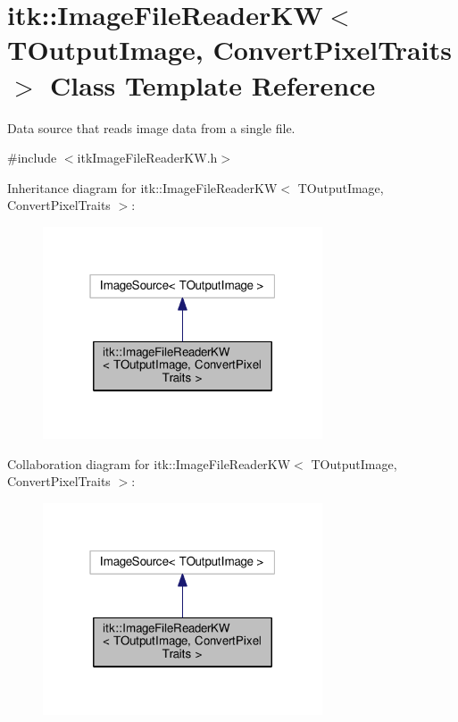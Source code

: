\hypertarget{classitk_1_1_image_file_reader_k_w}{}\section{itk\+:\+:Image\+File\+Reader\+KW$<$ T\+Output\+Image, Convert\+Pixel\+Traits $>$ Class Template Reference}
\label{classitk_1_1_image_file_reader_k_w}


Data source that reads image data from a single file.  




{\ttfamily \#include $<$itk\+Image\+File\+Reader\+K\+W.\+h$>$}



Inheritance diagram for itk\+:\+:Image\+File\+Reader\+KW$<$ T\+Output\+Image, Convert\+Pixel\+Traits $>$\+:
\nopagebreak
\begin{figure}[H]
\begin{center}
\leavevmode
\includegraphics[width=235pt]{classitk_1_1_image_file_reader_k_w__inherit__graph}
\end{center}
\end{figure}


Collaboration diagram for itk\+:\+:Image\+File\+Reader\+KW$<$ T\+Output\+Image, Convert\+Pixel\+Traits $>$\+:
\nopagebreak
\begin{figure}[H]
\begin{center}
\leavevmode
\includegraphics[width=235pt]{classitk_1_1_image_file_reader_k_w__coll__graph}
\end{center}
\end{figure}
